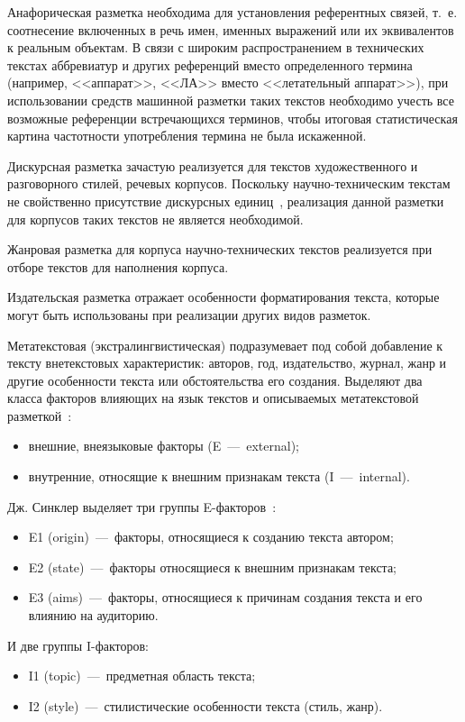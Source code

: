 Анафорическая разметка необходима для установления референтных связей, т.~е. соотнесение включенных в речь имен, именных выражений или их эквивалентов к реальным объектам. В связи с широким распространением в технических текстах аббревиатур и других референций вместо определенного термина (например, <<аппарат>>, <<ЛА>> вместо <<летательный аппарат>>), при использовании средств машинной разметки таких текстов необходимо учесть все возможные референции встречающихся терминов, чтобы итоговая статистическая картина частотности употребления термина не была искаженной.

Дискурсная разметка зачастую реализуется для текстов художественного и разговорного стилей, речевых корпусов. Поскольку научно-техническим текстам не свойственно присутствие дискурсных единиц~\cite{bogdanova2014}, реализация данной разметки для корпусов таких текстов не является необходимой.

Жанровая разметка для корпуса научно-технических текстов реализуется при отборе текстов для наполнения корпуса. 

Издательская разметка отражает особенности форматирования текста, которые могут быть использованы при реализации других видов разметок. 

Метатекстовая (экстралингвистическая) подразумевает под собой добавление к тексту внетекстовых характеристик: авторов, год, издательство, журнал, жанр и другие особенности текста или обстоятельства его создания. Выделяют два класса факторов влияющих на язык текстов и описываемых метатекстовой разметкой~\cite{Zaharov}:
\begin{itemize}
	\item внешние, внеязыковые факторы (E~---~external);
	\item внутренние, относящие к внешним признакам текста (I~---~internal).
\end{itemize}

Дж. Синклер выделяет три группы E-факторов~\cite{sinclair1996preliminary}:
\begin{itemize}
	\item E1 (origin)~---~факторы, относящиеся к созданию текста автором;
	\item E2 (state)~---~факторы относящиеся к внешним признакам текста;
	\item E3 (aims)~---~факторы, относящиеся к причинам создания текста и его влиянию на аудиторию.
\end{itemize}
И две группы I-факторов:
\begin{itemize}
	\item I1 (topic)~---~предметная область текста;
	\item I2 (style)~---~стилистические особенности текста (стиль, жанр).
\end{itemize}

